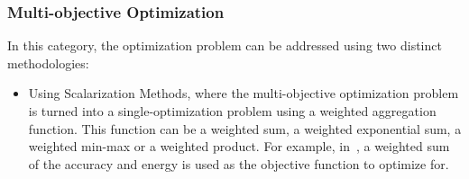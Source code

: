         \subsubsection{Multi-objective Optimization}
            In this category, the optimization problem can be addressed using two distinct methodologies:
            \begin{itemize}
                \item Using Scalarization Methods, where the multi-objective optimization problem is turned into a single-optimization problem using a weighted aggregation function. This function can be a weighted sum, a weighted exponential sum, a weighted min-max or a weighted product. For example, in~, a weighted sum of the accuracy and energy is used as the objective function to optimize for. 
            \end{itemize}
